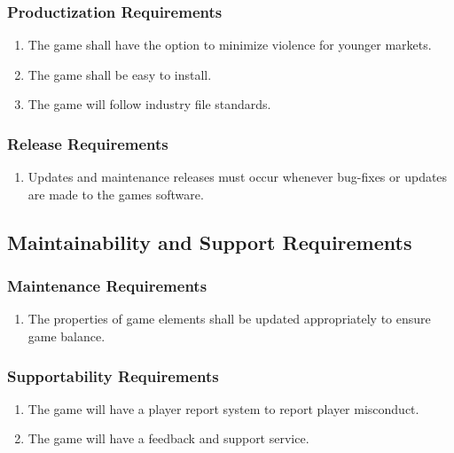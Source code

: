 \documentclass[]{article}
\begin{document}
\subsubsection{Productization Requirements}
\label{ssub:productization_requirements}
\begin{enumerate}[{OE}1. ]
	\item The game shall have the option to minimize violence for younger markets.
	\item The game shall be easy to install.
	\item The game will follow industry file standards.
\end{enumerate}

\subsubsection{Release Requirements}
\label{ssub:release_requirements}
\begin{enumerate}[{OE}1. ]
	\item Updates and maintenance releases must occur whenever bug-fixes or updates are made to the games software.

\end{enumerate}


\subsection{Maintainability and Support Requirements}
\label{sub:maintainability_and_support_requirements}

\subsubsection{Maintenance Requirements}
\label{ssub:maintenance_requirements}
\begin{enumerate}[{MS}1. ]
	\item The properties of game elements shall be updated appropriately to ensure game balance.
\end{enumerate}

\subsubsection{Supportability Requirements}
\label{ssub:supportability_requirements}
\begin{enumerate}[{MS}1. ]
	\item The game will have a player report system to report player misconduct.
	\item The game will have a feedback and support service.
\end{enumerate}
\end{document}
